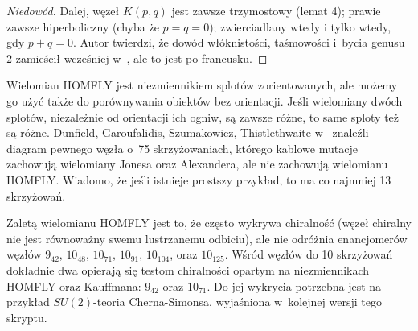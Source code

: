 \begin{proof}[Niedowód]
    Dalej, węzeł $K(p,q)$ jest zawsze trzymostowy (lemat 4); prawie zawsze hiperboliczny (chyba że $p = q = 0$); zwierciadlany wtedy i tylko wtedy, gdy $p + q = 0$.
    Autor twierdzi, że dowód włóknistości, taśmowości i~bycia genusu $2$ zamieścił wcześniej w~\cite{kanenobu1981}, ale to jest po francusku.
\end{proof}

Wielomian HOMFLY jest niezmiennikiem splotów zorientowanych, ale możemy go użyć także do porównywania obiektów bez orientacji.
Jeśli wielomiany dwóch splotów, niezależnie od orientacji ich ogniw, są zawsze różne, to same sploty też są różne.
Dunfield, Garoufalidis, Szumakowicz, Thistlethwaite w~\cite{dunfield2010} znaleźli diagram pewnego węzła o~75 skrzyżowaniach, którego kablowe mutacje zachowują wielomiany Jonesa oraz Alexandera, ale nie zachowują wielomianu HOMFLY.
%
%
%
%
%
Wiadomo, że jeśli istnieje prostszy przykład, to ma co najmniej 13 skrzyżowań.

Zaletą wielomianu HOMFLY jest to, że często wykrywa chiralność (węzeł chiralny nie jest równoważny swemu lustrzanemu odbiciu), ale nie odróżnia enancjomerów węzłów $9_{42}$, $10_{48}$, $10_{71}$, $10_{91}$, $10_{104}$, oraz $10_{125}$.
%
Wśród węzłów do 10 skrzyżowań dokładnie dwa opierają się testom chiralności opartym na niezmiennikach HOMFLY oraz Kauffmana: $9_{42}$ oraz $10_{71}$.
%
%
Do jej wykrycia potrzebna jest na przykład $SU(2)$-teoria Cherna-Simonsa, wyjaśniona w~kolejnej wersji tego skryptu.


%


